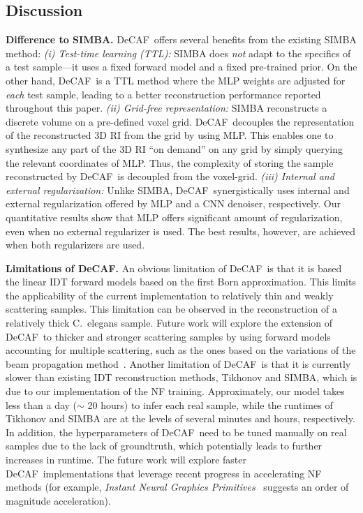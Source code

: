 \documentclass[11pt]{article}
\theoremstyle{plain} %
\def\proposed{DeCAF}
\begin{document}
\subsection*{Discussion}
\textbf{Difference to SIMBA.} \proposed~offers several benefits from the existing SIMBA method: 
\emph{(i) Test-time learning (TTL):} SIMBA does \emph{not} adapt to the specifics of a test sample---it uses a fixed forward model and a fixed pre-trained prior. On the other hand, \proposed~is a TTL method where the MLP weights are adjusted for \emph{each} test sample, leading to a better reconstruction performance reported throughout this paper. 
\emph{(ii) Grid-free representation: } SIMBA reconstructs a discrete volume on a pre-defined voxel grid. \proposed~decouples the representation of the reconstructed 3D RI from the grid by using MLP. This enables one to synthesize any part of the 3D RI ``on demand'' on any grid by simply querying the relevant coordinates of MLP. Thus, the complexity of storing the sample reconstructed by \proposed~is decoupled from the voxel-grid.
\emph{(iii) Internal and external regularization: } Unlike SIMBA, \proposed~synergistically uses internal and external regularization offered by MLP and a CNN denoiser, respectively. Our quantitative results show that MLP offers significant amount of regularization, even when no external regularizer is used. The best results, however, are achieved when both regularizers are used.

\vspace{0.5em}
\noindent
\textbf{Limitations of \proposed.}
An obvious limitation of \proposed~is that it is based the linear IDT forward models based on the first Born approximation. This limits the applicability of the current implementation to relatively thin and weakly scattering samples. This limitation can be observed in the reconstruction of a relatively thick C.\ elegans sample. 
Future work will explore the extension of \proposed~to thicker and stronger scattering samples by using forward models accounting for multiple scattering, such as the ones based on the variations of the beam propagation method~\cite{Kamilov.etal2015, Tian.Waller2015}. 
Another limitation of \proposed~is that it is currently slower than existing IDT reconstruction methods, Tikhonov and SIMBA, which is due to our implementation of the NF training.
Approximately, our model takes less than a day ($\sim$ 20 hours) to infer each real sample, while the runtimes of Tikhonov and SIMBA are at the levels of several minutes and hours, respectively.
In addition, the hyperparameters of \proposed~need to be tuned manually on real samples due to the lack of groundtruth, which potentially leads to further increases in runtime.
The future work will explore faster \proposed~implementations that leverage recent progress in accelerating NF methods (for example, \emph{Instant Neural Graphics Primitives}~\cite{Mueller.etal2022} suggests an order of magnitude acceleration).
\end{document}
